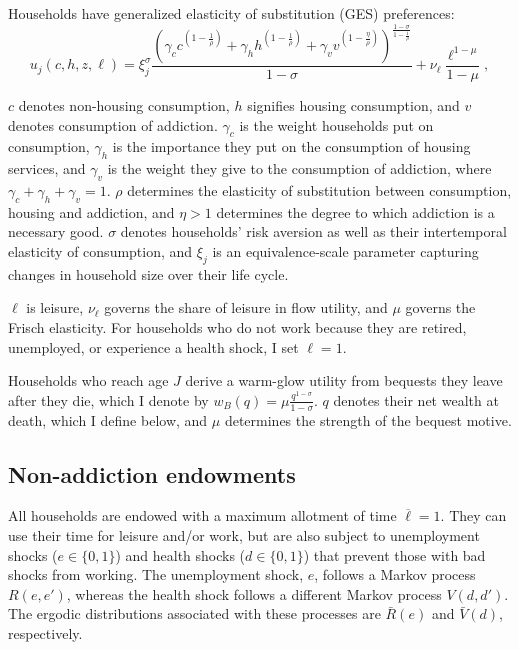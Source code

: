 \documentclass[parskip=full]{article}
\begin{document}
Households have generalized elasticity of substitution (GES) preferences: 
\begin{equation}
    u_j(c,h,z,\ell)=\xi_{j}^{\sigma}\frac{\left(\gamma_{c} c^{\left(1-\frac{1}{\rho}\right)} + \gamma_h h^{\left(1-\frac{1}{\rho}\right)} + \gamma_{v} {v}^{\left(1-\frac{\eta}{\rho}\right)} \right)^{\frac{1-\sigma}{1-\frac{1}{\rho}}}}{1-\sigma} + \nu_{\ell}\frac{\ell^{1-\mu}}{1-\mu},
\end{equation}

\noindent $c$ denotes non-housing consumption, $h$ signifies housing consumption, and $v$ denotes consumption of addiction. $\gamma_c$ is the weight households put on consumption, $\gamma_h$ is the importance they put on the consumption of housing services, and $\gamma_{v}$ is the weight they give to the consumption of addiction, where $\gamma_c+\gamma_h+\gamma_{v}=1$. $\rho$ determines the elasticity of substitution between consumption, housing and addiction, and $\eta>1$ determines the degree to which addiction is a necessary good. $\sigma$ denotes households' risk aversion as well as their intertemporal elasticity of consumption, and $\xi_j$ is an equivalence-scale parameter capturing changes in household size over their life cycle.

$\ell$ is leisure, $\nu_{\ell}$ governs the share of leisure in flow utility, and $\mu$ governs the Frisch elasticity. For households who do not work because they are retired, unemployed, or experience a health shock, I set $\ell=1$.

Households who reach age $J$ derive a warm-glow utility from bequests they leave after they die, which I denote by $w_B(q)=\mu \frac{q^{1-\sigma}}{1-\sigma}$. $q$ denotes their net wealth at death, which I define below, and $\mu$ determines the strength of the bequest motive.

\subsection{Non-addiction endowments}\label{sec:non_addiction_endowments}
All households are endowed with a maximum allotment of time $\overline{\ell}=1$. They can use their time for leisure and/or work, but are also subject to unemployment shocks ($e \in \{0,1\}$) and health shocks ($d \in \{0,1\}$) that prevent those with bad shocks from working. The unemployment shock, $e$, follows a Markov process $R(e,e')$, whereas the health shock follows a different Markov process $V(d,d')$. The ergodic distributions associated with these processes are $\bar{R}(e)$ and $\bar{V}(d)$, respectively.
\end{document}
